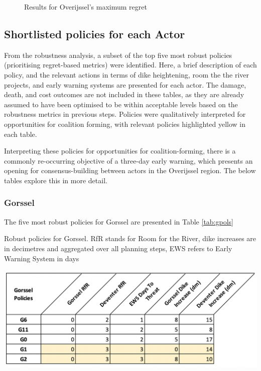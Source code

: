 \begin{figure}[H]
\begin{minipage}[b]{0.4\textwidth}
    \caption{Results for Overijssel's maximum regret}
    \label{fig:regret_Overijssels}
  \end{minipage}
\end{figure}

\subsection{Shortlisted policies for each Actor}
From the robustness analysis, a subset of the top five most robust policies (prioritising regret-based metrics) were identified. Here, a brief description of each policy, and the relevant actions in terms of dike heightening, room the the river projects, and early warning systems are presented for each actor. The damage, death, and cost outcomes are not included in these tables, as they are already assumed to have been optimised to be within acceptable levels based on the robustness metrics in previous steps. Policies were qualitatively interpreted for opportunities for coalition forming, with relevant policies highlighted yellow in each table.

Interpreting these policies for opportunities for coalition-forming, there is a commonly re-occurring objective of a three-day early warning, which presents an opening for consensus-building between actors in the Overijssel region. The below tables explore this in more detail.

\subsubsection{Gorssel}
The five most robust policies for Gorssel are presented in Table \ref{tab:gpols}

\begin{table}[h!]
  \centering
  \captionsetup{justification=centering,margin=2cm}
  \caption{Robust policies for Gorssel. RfR stands for Room for the River, dike increases are in decimetres and aggregated over all planning steps, EWS refers to Early Warning System in days}
  \label{tab:gpols}
  \includegraphics[width=0.8\linewidth]{report/figures/gpols.png}
\end{table}


